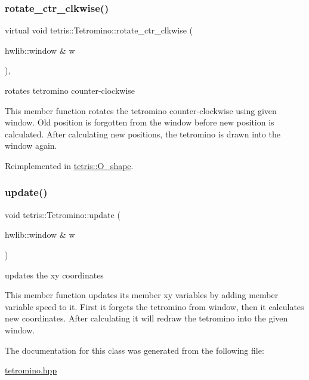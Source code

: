 \mbox{\label{classtetris_1_1Tetromino_a948dca1ff8a7e128270cdbbba8d214a3}} 
\subsubsection{\texorpdfstring{rotate\+\_\+ctr\+\_\+clkwise()}{rotate\_ctr\_clkwise()}}
{\footnotesize\ttfamily virtual void tetris\+::\+Tetromino\+::rotate\+\_\+ctr\+\_\+clkwise (\begin{DoxyParamCaption}\item[{hwlib\+::window \&}]{w }\end{DoxyParamCaption})\hspace{0.3cm}{\ttfamily [inline]}, {\ttfamily [virtual]}}



rotates tetromino counter-\/clockwise 

This member function rotates the tetromino counter-\/clockwise using given window. Old position is forgotten from the window before new position is calculated. After calculating new positions, the tetromino is drawn into the window again. 

Reimplemented in \hyperlink{classtetris_1_1O__shape_adc8c727b5ae2ea3905ff70107be511bd}{tetris\+::\+O\+\_\+shape}.

\mbox{\label{classtetris_1_1Tetromino_a2e9fa7445d505ea6125bd692cd7f0aa2}} 
\subsubsection{\texorpdfstring{update()}{update()}}
{\footnotesize\ttfamily void tetris\+::\+Tetromino\+::update (\begin{DoxyParamCaption}\item[{hwlib\+::window \&}]{w }\end{DoxyParamCaption})\hspace{0.3cm}{\ttfamily [inline]}}



updates the xy coordinates 

This member function updates its member xy variables by adding member variable speed to it. First it forgets the tetromino from window, then it calculates new coordinates. After calculating it will redraw the tetromino into the given window. 

The documentation for this class was generated from the following file\+:\begin{DoxyCompactItemize}
\item 
\hyperlink{tetromino_8hpp}{tetromino.\+hpp}\end{DoxyCompactItemize}
